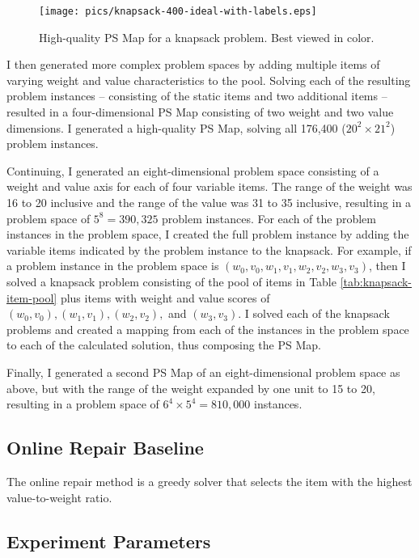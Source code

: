\begin{figure}
\begin{center}
\texttt{[image: pics/knapsack-400-ideal-with-labels.eps]}
\caption{High-quality PS Map for a knapsack problem.  Best viewed in color.}
\label{fig:knapsack-ideal}
\end{center}
\end{figure}

I then generated more complex problem spaces  by adding multiple items of varying weight and value characteristics to the pool.  Solving each of the resulting problem instances -- consisting of the static items and two additional items -- resulted in a four-dimensional PS Map consisting of two weight and two value dimensions.  I generated a high-quality PS Map, solving all 176,400 ($20^2 \times 21^2$) problem instances.  

Continuing, I generated an eight-dimensional problem space consisting of a weight and value axis for each of four variable items.  The range of the weight was 16 to 20 inclusive and the range of the value was 31 to 35 inclusive, resulting in a problem space of $5^8 = 390,325$ problem instances.  For each of the problem instances in the problem space, I created the full problem instance by adding the variable items indicated by the problem instance to the knapsack.  For example, if a problem instance in the problem space is $(w_0,v_0,w_1,v_1,w_2,v_2,w_3,v_3)$, then I solved a knapsack problem consisting of the pool of items in Table \ref{tab:knapsack-item-pool} plus items with weight and value scores of $(w_0,v_0),(w_1,v_1),(w_2,v_2),$ and $(w_3,v_3)$.  I solved each of the knapsack problems and created a mapping from each of the instances in the problem space to each of the calculated solution, thus composing the PS Map.

Finally, I generated a second PS Map of an eight-dimensional problem space as above, but with the range of the weight expanded by one unit to 15 to 20, resulting in a problem space of $6^4 \times 5^4 = 810,000$ instances.



\subsection{Online Repair Baseline}  The online repair method is a greedy solver that selects the item with the highest value-to-weight ratio.


\subsection{Experiment Parameters}

